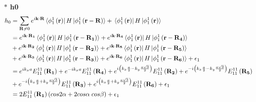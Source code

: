 \documentclass{report}
\begin{document}
\textbf{ $\ast$ h0}
\begin{align*}
	h_0 & = \sum_{\mathbf{R} \neq 0} e^{i\mathbf{k\cdot R}} \bra*{\phi_1^1 \left(\mathbf{r}\right)} H \ket*{\phi_1^1\left(\mathbf{r}-\mathbf{R}\right)}
	+ \bra*{\phi_1^1 \left(\mathbf{r}\right)} H \ket*{\phi_1^1\left(\mathbf{r}\right)}                                                                                                                                                                                                                                          \\
	    & = e^{i\mathbf{k\cdot R_1}} \bra*{\phi_1^1 \left(\mathbf{r}\right)} H \ket*{\phi_1^1\left(\mathbf{r}-\mathbf{R_1}\right)} + e^{i\mathbf{k\cdot R_4}} \bra*{\phi_1^1 \left(\mathbf{r}\right)} H \ket*{\phi_1^1\left(\mathbf{r}-\mathbf{R_4}\right)}                                                                     \\
	    & + e^{i\mathbf{k\cdot R_2}} \bra*{\phi_1^1 \left(\mathbf{r}\right)} H \ket*{\phi_1^1\left(\mathbf{r}-\mathbf{R_2}\right)} + e^{i\mathbf{k\cdot R_5}} \bra*{\phi_1^1 \left(\mathbf{r}\right)} H \ket*{\phi_1^1\left(\mathbf{r}-\mathbf{R_5}\right)}                                                                     \\
	    & + e^{i\mathbf{k\cdot R_3}} \bra*{\phi_1^1 \left(\mathbf{r}\right)} H \ket*{\phi_1^1\left(\mathbf{r}-\mathbf{R_3}\right)} + e^{i\mathbf{k\cdot R_6}} \bra*{\phi_1^1 \left(\mathbf{r}\right)} H \ket*{\phi_1^1\left(\mathbf{r}-\mathbf{R_6}\right)} + \epsilon_1                                                        \\
	    & = e^{i k_x a} E_{11}^{11}\left(\mathbf{R_1}\right) + e^{-i k_x a} E_{11}^{11}\left(\mathbf{R_4}\right) +  e^{i \left( k_x \frac{a}{2} - k_y \frac{a\sqrt{3}}{2} \right)} E_{11}^{11}\left(\mathbf{R_2}\right) +  e^{-i \left( k_x \frac{a}{2} - k_y \frac{a\sqrt{3}}{2} \right)} E_{11}^{11}\left(\mathbf{R_5}\right) \\
	    & + e^{-i \left( k_x \frac{a}{2} + k_y \frac{a\sqrt{3}}{2} \right)} E_{11}^{11}\left(\mathbf{R_3}\right) + e^{i \left( k_x \frac{a}{2} + k_y \frac{a\sqrt{3}}{2} \right)} E_{11}^{11}\left(\mathbf{R_6}\right) + \epsilon_1                                                                                             \\
	    & = 2 E_{11}^{11}\left(\mathbf{R_1}\right) \left(cos2\alpha + 2cos\alpha\; cos\beta\right) + \epsilon_1
\end{align*}
\end{document}

